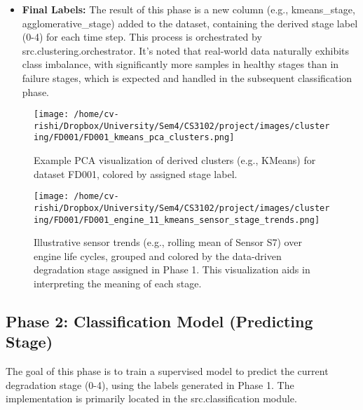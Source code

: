 \begin{itemize}
\begin{itemize}
	      \end{itemize}
	\item \textbf{Final Labels:} The result of this phase is a new column (e.g., kmeans\_stage, agglomerative\_stage) added to the dataset, containing the derived stage label (0-4) for each time step. This process is orchestrated by src.clustering.orchestrator. It's noted that real-world data naturally exhibits class imbalance, with significantly more samples in healthy stages than in failure stages, which is expected and handled in the subsequent classification phase.
\end{itemize}

\begin{figure}[t]
	\centering
	\texttt{[image: /home/cv-rishi/Dropbox/University/Sem4/CS3102/project/images/clustering/FD001/FD001\_kmeans\_pca\_clusters.png]}
	\caption{Example PCA visualization of derived clusters (e.g., KMeans) for dataset FD001, colored by assigned stage label.}
	\label{fig:cluster_pca}
\end{figure}

\begin{figure*}[t]
	\centering
	\texttt{[image: /home/cv-rishi/Dropbox/University/Sem4/CS3102/project/images/clustering/FD001/FD001\_engine\_11\_kmeans\_sensor\_stage\_trends.png]}
	\caption{Illustrative sensor trends (e.g., rolling mean of Sensor S7) over engine life cycles, grouped and colored by the data-driven degradation stage assigned in Phase 1. This visualization aids in interpreting the meaning of each stage.}
	\label{fig:sensor_trends_cluster}
\end{figure*}

\subsection{Phase 2: Classification Model (Predicting Stage)}
\label{subsec:classification}
The goal of this phase is to train a supervised model to predict the current degradation stage (0-4), using the labels generated in Phase 1. The implementation is primarily located in the src.classification module.

